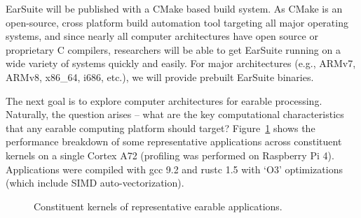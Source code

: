 EarSuite will be published with a CMake based build system.  As CMake is an
open-source, cross platform build automation tool targeting all major operating
systems, and since nearly all computer architectures have open source or
proprietary C compilers, researchers will be able to get EarSuite running on a
wide variety of systems quickly and easily. For major architectures (e.g.,
ARMv7, ARMv8, x86\_64, i686, etc.), we will provide prebuilt EarSuite binaries.

The next goal is to explore computer architectures for earable processing.
Naturally, the question arises --
what are the key computational characteristics that any earable computing
platform should target?
Figure~\ref{fig:kernels_breakdown} shows the performance breakdown of some
representative applications across constituent kernels on a single Cortex A72
(profiling was performed on Raspberry Pi 4).  Applications were compiled with
gcc 9.2 and rustc 1.5 with `O3' optimizations (which include SIMD
auto-vectorization).
 
 
 
\begin{figure}[h]
  \centering
  
    \scalebox{0.65}{}
  \caption{\small Constituent kernels of representative earable applications.}
    \label{fig:kernels_breakdown}
\end{figure}


